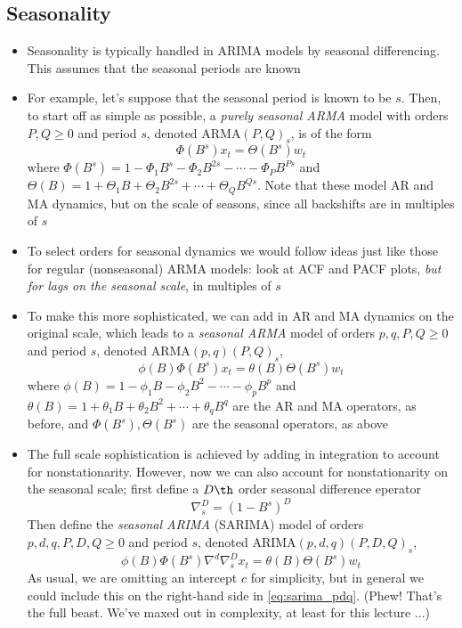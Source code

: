 \documentclass{article}
\begin{document}
\subsection{Seasonality}

\begin{itemize}
\item Seasonality is typically handled in ARIMA models by seasonal
  differencing. This assumes that the seasonal periods are known

\item For example, let's suppose that the seasonal period is known to be
  $s$. Then, to start off as simple as possible, a \emph{purely seasonal ARMA}
  model with orders $P,Q \geq 0$ and period $s$, denoted ARMA$(P,Q)_s$, is of 
  the form   
  \begin{equation}
  \label{eq:pure_sarma_pq}
  \Phi(B^s) x_t = \Theta(B^s) w_t  
  \end{equation}
  where $\Phi(B^s) = 1 - \Phi_1 B^s - \Phi_2 B^{2s} - \cdots - \Phi_P B^{Ps}$
  and $\Theta(B) = 1 + \Theta_1 B + \Theta_2 B^{2s} + \cdots + \Theta_Q
  B^{Qs}$. Note that these model AR and MA dynamics, but on the scale of
  seasons, since all backshifts are in multiples of $s$

\item To select orders for seasonal dynamics we would follow ideas just like
  those for regular (nonseasonal) ARMA models: look at ACF and PACF plots,
  \emph{but for lags on the seasonal scale}, in multiples of $s$ 

\item To make this more sophisticated, we can add in AR and MA dynamics on
  the original scale, which leads to a \emph{seasonal ARMA} model of orders 
  $p,q,P,Q \geq 0$ and period $s$, denoted ARMA$(p,q)(P,Q)_s$,   
  \begin{equation}
  \label{eq:sarma_pq}
  \phi(B) \Phi(B^s) x_t = \theta(B) \Theta(B^s) w_t  
  \end{equation}
  where $\phi(B) = 1 - \phi_1 B - \phi_2 B^2 - \cdots - \phi_p B^p$ and
  $\theta(B) = 1 + \theta_1 B + \theta_2 B^2 + \cdots + \theta_q B^q$ are the AR 
  and MA operators, as before, and $\Phi(B^s), \Theta(B^s)$ are the seasonal
  operators, as above

\item The full scale sophistication is achieved by adding in integration to
  account for nonstationarity. However, now we can also account for
  nonstationarity on the seasonal scale; first define a $D\th$ order seasonal
  difference eperator
  \[
  \nabla_s^D = (1 - B^s)^D 
  \]
  Then define the \emph{seasonal ARIMA} (SARIMA) model of orders $p,d,q,P,D,Q 
  \geq 0$ and period $s$, denoted ARIMA$(p,d,q)(P,D,Q)_s$, 
  \begin{equation}
  \label{eq:sarima_pdq}
  \phi(B) \Phi(B^s) \nabla^d \nabla_s^D x_t = \theta(B) \Theta(B^s) w_t  
  \end{equation}
  As usual, we are omitting an intercept $c$ for simplicity, but in general we
  could include this on the right-hand side in \eqref{eq:sarima_pdq}. (Phew!
  That's the full beast. We've maxed out in complexity, at least for this
  lecture ...) 


\end{itemize}
\end{document}
